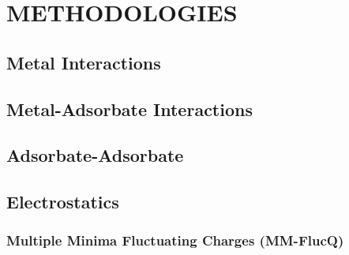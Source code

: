 \chapter{METHODOLOGIES}

\section{Metal Interactions}

\section{Metal-Adsorbate Interactions}
% 

\section{Adsorbate-Adsorbate}



\section{Electrostatics}


\subsection{Multiple Minima Fluctuating Charges (MM-FlucQ)}

